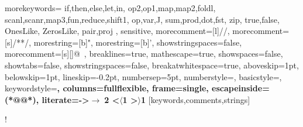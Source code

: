 \usepackage{todonotes}
\newcommand{\TODO}[1]{\todo[inline,author=TODO]{#1}}
\newcommand{\AS}[1]{\todo[inline,author=AS]{#1}}
\newcommand{\as}[1]{\todo[size=\tiny]{as: #1}{}}
\newcommand{\SSS}[1]{\todo[inline,author=SS]{#1}}
\newcommand{\sss}[1]{\todo[size=\tiny]{ss: #1}{}}
\newcommand{\EA}[1]{\todo[inline,author=EA]{#1}}
\newcommand{\ea}[1]{\todo[size=\tiny]{ea: #1}{}}
\newcommand{\MH}[1]{\todo[inline,author=MH]{#1}}
\newcommand{\mh}[1]{\todo[size=\tiny]{mh: #1}{}}
\newcommand{\YK}[1]{\todo[inline,author=YK]{#1}}
\newcommand{\yk}[1]{\todo[size=\tiny]{yk: #1}{}}

\usepackage{amsmath}
\usepackage{mathtools}
\usepackage{suffix}
\usepackage{tikz-cd}
\usepackage{mathpartir}
\usepackage{enumitem}
\usepackage{stmaryrd}
\usepackage[all]{xy}
\usepackage{twoopt}
\usepackage{array}
\usepackage{listings}
\usepackage{multirow, bigdelim}

%
{morekeywords={
  if,then,else,let,in,
  op2,op1,map,map2,foldl,
  scanl,scanr,map3,fun,reduce,shift1,
  op,var,J,
  sum,prod,dot,fst,
  zip,
  true,false,
  OnesLike,
  ZerosLike,
  pair,proj
  },%
  sensitive,%
  morecomment=[l]//,%
  morecomment=[s]{/*}{*/},%
  morestring=[b]",%
  morestring=[b]',%
  showstringspaces=false,%
  morecomment=[s][\color{gray}]{@}{\ },%
    breaklines=true,%
  mathescape=true,%
showspaces=false,
showtabs=false,
showstringspaces=false,
breakatwhitespace=true,
  aboveskip=1pt,
  belowskip=1pt,
  lineskip=-0.2pt,
  numbersep=5pt,
  numberstyle=\tiny\ttfamily,
  basicstyle=\small\ttfamily,
  keywordstyle=\bfseries\color{blue!70!black},%
  columns=fullflexible,
  frame=single,
  escapeinside={(*@}{@*)},
  literate={->}{$\rightarrow\;$}{2}
           {<}{$\langle$}{1}
           {>}{$\rangle$}{1}
}[keywords,comments,strings]%

\lstset{language=llql}
\lstMakeShortInline[columns=fixed]!


\newcommand{\system}{RAD\xspace}
\newcommand{\dfsmooth}{$\text{d}\widetilde{\textsc{f}}$\xspace}
\newcommand{\supfull}{\CIRCLE}
\newcommand{\suphalf}{\LEFTcircle}
\newcommand{\supnone}{\Circle}
\newcommand{\supfullstar}{\hspace{1ex}\supfull*}
\newcommand{\notexists}{-}
\newcommand{\RR}{\mathbb{R}}

\newtheorem{notation}{Notation}
\newtheorem{remark}{Remark}

\newcommand{\code}[1]{\texttt{#1}}

\newcommand{\dif}{\mathop{}\!\mathrm{d}}
\newcommand{\Diff}{\mathbf{Diff}}
\newcommand{\sem}[1]{\llbracket #1\rrbracket}
\newcommand{\semgl}[1]{\llparenthesis #1\rrparenthesis}
\newcommand{\defeq}{\stackrel {\mathrm{def}}=}

